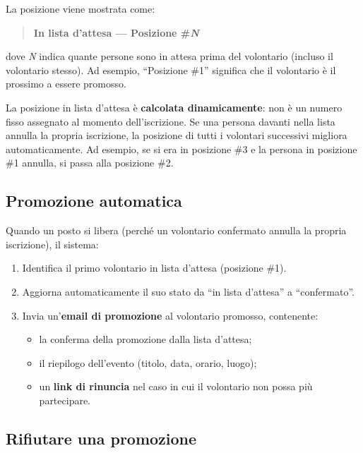 \documentclass[a4paper,11pt,oneside]{book}
\begin{document}
La posizione viene mostrata come:

\begin{quote}
\textbf{In lista d'attesa --- Posizione \#\textit{N}}
\end{quote}

dove \textit{N} indica quante persone sono in attesa prima del volontario (incluso il volontario stesso). Ad esempio, ``Posizione \#1'' significa che il volontario \`e il prossimo a essere promosso.

\begin{infobox}
La posizione in lista d'attesa \`e \textbf{calcolata dinamicamente}: non \`e un numero fisso assegnato al momento dell'iscrizione. Se una persona davanti nella lista annulla la propria iscrizione, la posizione di tutti i volontari successivi migliora automaticamente. Ad esempio, se si era in posizione \#3 e la persona in posizione \#1 annulla, si passa alla posizione \#2.
\end{infobox}

\subsection{Promozione automatica}

Quando un posto si libera (perch\'e un volontario confermato annulla la propria iscrizione), il sistema:

\begin{enumerate}[leftmargin=1.5em]
  \item Identifica il primo volontario in lista d'attesa (posizione \#1).
  \item Aggiorna automaticamente il suo stato da ``in lista d'attesa'' a ``confermato''.
  \item Invia un'\textbf{email di promozione} al volontario promosso, contenente:
    \begin{itemize}
      \item la conferma della promozione dalla lista d'attesa;
      \item il riepilogo dell'evento (titolo, data, orario, luogo);
      \item un \textbf{link di rinuncia} nel caso in cui il volontario non possa pi\`u partecipare.
    \end{itemize}
\end{enumerate}

\subsection{Rifiutare una promozione}
\end{document}
